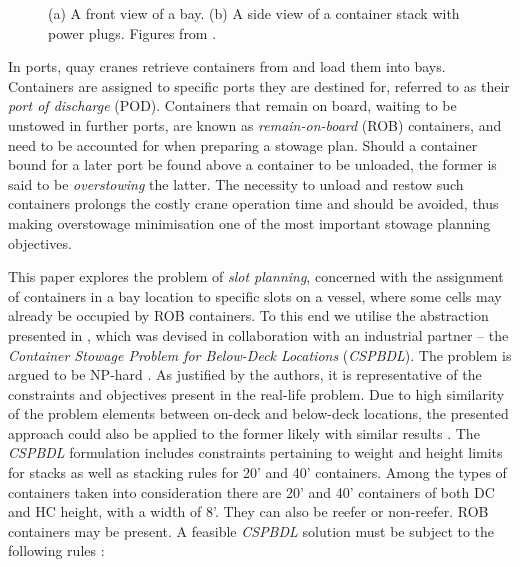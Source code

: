 \documentclass[preprint,12pt,3p]{elsarticle}
\begin{document}
\begin{figure}[ht]
\begin{subfigure}[b]{0.28\textwidth}
        \caption{}
        \label{fig:stack}
    \end{subfigure}
    \caption{(a) A front view of a bay. (b) A side view of a container stack with power plugs. Figures from \cite{PDJB12}.}\label{fig:bay_stack}
\end{figure}

In ports, quay cranes retrieve containers from and load them into bays. Containers are assigned to specific ports they are destined for, referred to as their \textit{port of discharge} (POD). Containers that remain on board, waiting to be unstowed in further ports, are known as \textit{remain-on-board} (ROB) containers, and need to be accounted for when preparing a stowage plan. Should a container bound for a later port be found above a container to be unloaded, the former is said to be \textit{overstowing} the latter. The necessity to unload and restow such containers prolongs the costly crane operation time and should be avoided, thus making overstowage minimisation one of the most important stowage planning objectives.

This paper explores the problem of \textit{slot planning}, concerned with the assignment of containers in a bay location to specific slots on a vessel, where some cells may already be occupied by ROB containers. To this end we utilise the abstraction presented in \cite{DJJRA12}, which was devised in collaboration with an industrial partner -- the \textit{Container Stowage Problem for Below-Deck Locations} (\textit{CSPBDL}). The problem is argued to be NP-hard \cite{DJJRA12}. As justified by the authors, it is representative of the constraints and objectives present in the real-life problem. Due to high similarity of the problem elements between on-deck and below-deck locations, the presented approach could also be applied to the former likely with similar results \cite{DJJRA12}. The \textit{CSPBDL} formulation includes constraints pertaining to weight and height limits for stacks as well as stacking rules for 20' and 40' containers. Among the types of containers taken into consideration there are 20' and 40' containers of both DC and HC height, with a width of 8'. They can also be reefer or non-reefer. ROB containers may be present. A feasible \textit{CSPBDL} solution must be subject to the following rules \cite{DJJRA12}:
\end{document}
